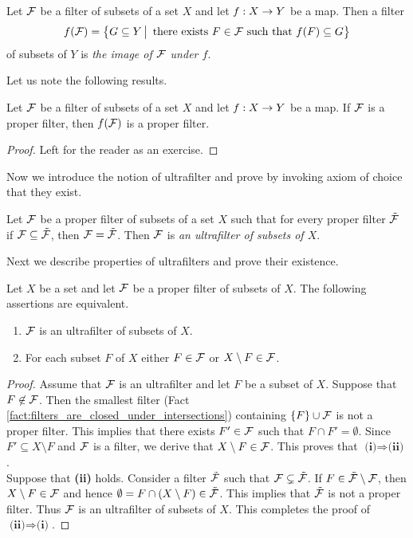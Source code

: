 \begin{definition}
Let ${\mathcal F}$ be a filter of subsets of a set $X$ and let $f:X\rightarrow Y$ be a map. Then a filter
$$f({\mathcal F}) = \big\{G\subseteq Y\,\big|\,\mbox{ there exists }F\in {\mathcal F}\mbox{ such that }f(F)\subseteq G\big\}$$
of subsets of $Y$ is \textit{the image of ${\mathcal F}$ under $f$}.
\end{definition}
\noindent
Let us note the following results.

\begin{fact}\label{fact:image_of_a_proper_filter_is_proper}
Let ${\mathcal F}$ be a filter of subsets of a set $X$ and let $f:X\rightarrow Y$ be a map. If ${\mathcal F}$ is a proper filter, then $f({\mathcal F})$ is a proper filter.
\end{fact}
\begin{proof}
Left for the reader as an exercise.
\end{proof}
\noindent
Now we introduce the notion of ultrafilter and prove by invoking axiom of choice that they exist.

\begin{definition}
Let ${\mathcal F}$ be a proper filter of subsets of a set $X$ such that for every proper filter $\tilde{{\mathcal F}}$ if ${\mathcal F} \subseteq \tilde{{\mathcal F}}$, then ${\mathcal F} = \tilde{{\mathcal F}}$. Then ${\mathcal F}$ is \textit{an ultrafilter of subsets of $X$}.
\end{definition}
\noindent
Next we describe properties of ultrafilters and prove their existence.

\begin{proposition}\label{proposition:ultrafilter_contains_either_susbet_or_its_complement}
Let $X$ be a set and let ${\mathcal F}$ be a proper filter of subsets of $X$. The following assertions are equivalent.
\begin{enumerate}[label=\emph{\textbf{(\roman*)}}, leftmargin=*]
\item ${\mathcal F}$ is an ultrafilter of subsets of $X$.
\item For each subset $F$ of $X$ either $F \in {\mathcal F}$ or $X\setminus F \in {\mathcal F}$.
\end{enumerate}
\end{proposition}
\begin{proof}
Assume that ${\mathcal F}$ is an ultrafilter and let $F$ be a subset of $X$. Suppose that $F\not \in {\mathcal F}$. Then the smallest filter (Fact \ref{fact:filters_are_closed_under_intersections}) containing $\{F\}\cup {\mathcal F}$ is not a proper filter. This implies that there exists $F' \in {\mathcal F}$ such that $F\cap F' = \emptyset$. Since $F'\subseteq X\setminus F$ and ${\mathcal F}$ is a filter, we derive that $X\setminus F \in {\mathcal F}$. This proves that $\textbf{(i)}\Rightarrow \textbf{(ii)}$.\\
Suppose that \textbf{(ii)} holds. Consider a filter $\tilde{{\mathcal F}}$ such that ${\mathcal F} \subsetneq \tilde{{\mathcal F}}$. If $F \in \tilde{{\mathcal F}}\setminus {\mathcal F}$, then $X\setminus F \in {\mathcal F}$ and hence $\emptyset = F\cap \left(X\setminus F\right) \in \tilde{{\mathcal F}}$. This implies that $\tilde{{\mathcal F}}$ is not a proper filter. Thus ${\mathcal F}$ is an ultrafilter of subsets of $X$. This completes the proof of $\textbf{(ii)}\Rightarrow \textbf{(i)}$.
\end{proof}

